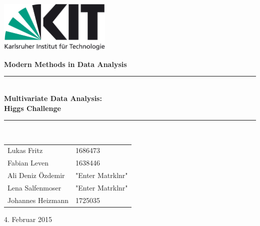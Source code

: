 \documentclass[11pt,a4paper]{scrartcl}
\newcommand{\Versuchsname}{Multivariate Data Analysis: \\ Higgs Challenge}			%
\newcommand{\Datum}{4. Februar 2015}			%
\begin{document}
\newcommand{\bra}[1]{\ensuremath{\left( #1 \right)}}
\newcommand{\abs}[1]{\ensuremath{\left| #1 \right|}}
\newcommand{\diff}[2]{\ensuremath{\frac{\partial #1}{\partial #2}}}

\newcommand{\HRule}{\rule{\linewidth}{0.5mm}}
\newcommand{\E}[1]{\textrm{#1}}
\begin{titlepage}
	\begin{flushright}
		\includegraphics[width=0.4\textwidth]{kit_logo_de_farbe_positiv.jpg}\\[1cm] 
	\end{flushright}
	\vspace{2cm}
	\begin{center}
	{\huge \textbf{Modern Methods in Data Analysis}}
	\vspace{1cm}

\HRule \\[0.4cm]
{ \huge \bfseries \Versuchsname}\\[0.2cm]
\HRule \\[0.5cm]

\begin{flushleft}
	\begin{minipage}{0.4\textwidth}
	\large
		\begin{tabular}{l l}
			Lukas Fritz & 1686473 \\
			Fabian Leven & 1638446\\
			Ali Deniz Özdemir & "Enter Matrklnr"\\
			Lena Salfenmoser & "Enter Matrklnr"\\
			Johannes Heizmann & 1725035 \\
		\end{tabular}
	\end{minipage}
\end{flushleft}
\vfill

{\large \Datum}
\end{center}

\end{titlepage}
\tableofcontents
\newpage










%
%
%
\end{document}
